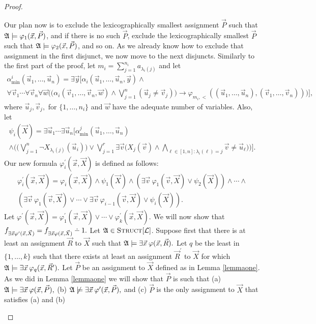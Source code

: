\documentclass[12pt]{article}
\def\dotminus{\mathbin{\ooalign{\hss\raise1ex\hbox{.}\hss\cr
  \mathsurround=0pt$-$}}}
\def\Truc{\textsc{Struct}[\L]}
\def\A{{\frak A}}
\def\L{{\cal L}}
\def\P{\vec{P}}
\def\R{\vec{R}}
\def\X{\vec{X}}
\def\u{\vec{u}} %
\def\v{\vec{v}} %
\def\w{\vec{w}} %
\def\x{\vec{x}} %
\def\y{\vec{y}} %
\begin{document}
\begin{proof}
\begin{enumerate}
Our plan now is to exclude the lexicographically smallest assignment $\P$ such that $\A\models\varphi_1(\x,\P)$, and if there is no such $\P$, exclude the lexicographically smallest $\P$ such that $\A\models\varphi_2(\x,\P)$, and so on. As we already know how to exclude that assignment in the first disjunct, we now move to the next disjuncts. Similarly to the first part of the proof, let $m_i = \sum_{j = 1}^{n_i} a_{\lambda_i(j)}$ and let
\begin{multline*}
\alpha^i_{\min}(\u_1,\dots,\u_n) = \exists\y\Big[ \alpha_i(\u_1,\dots,\u_n,\y)\wedge \\ \forall\v_1\cdots\forall\v_n\forall\w\Big(\big(\alpha_i(\v_1,\dots,\v_n,\w)\wedge\bigvee_{j=1}^n(\u_j\neq\v_j)\big)\to \varphi_{m_i,<}((\u_1,\dots,\u_n),(\v_1,\dots,\v_n))\Big)\Big],
\end{multline*}
where $\u_j,\v_j,$ for $\{1,\ldots,n_i\}$ and $\w$ have the adequate number of variables. Also, let
\begin{multline*}
\psi_i(\X) = \exists\u_1\cdots\exists\u_n\bigg[\alpha^j_{\min}(\u_1,\dots,\u_n) \\ \wedge \bigg(\bigg(\bigvee_{j = 1}^{n}\neg X_{\lambda_i(j)}(\u_i) \bigg) \vee \bigvee_{j=1}^r \exists \v\Big( X_j(\v) \wedge \bigwedge_{\ell\in[1,n]: \lambda_i(\ell) = j} \v \neq \u_\ell\Big) \bigg) \bigg].
\end{multline*}
Our new formula $\varphi_i^\prime(\x,\X)$ is defined as follows:
\begin{multline}
\varphi_i^\prime(\x,\X) = \varphi_i(\x,\X) \wedge \psi_1(\X) \wedge (\exists\v\:\varphi_1(\v,\X)\vee\psi_2(\X)) \wedge \cdots \wedge \\ (\exists\v\:\varphi_1(\v,\X)\vee\cdots\vee\exists\v\:\varphi_{i-1}(\v,\X)\vee\psi_i(\X)).
\end{multline}
Let $\varphi^\prime(\x,\X) = \varphi_1^\prime(\x,\X)\vee\cdots\vee\varphi_k^\prime(\x,\X).$ We will now show that $f_{\exists\x\varphi^\prime(\x,\X)} = f_{\exists\x\varphi(\x,\X)}\dotminus 1.$ Let $\A\in\Truc$. Suppose first that there is at least an assignment $\R$ to $\X$ such that $\A\models\exists\x\:\varphi(\x,\R).$ Let $q$ be the least in $\{1,\ldots,k\}$ such that there exists at least an assignment $\R^\prime$ to $\X$ for which $\A\models\exists\x\:\varphi_q(\x,\R^\prime).$ Let $\P$ be an assignment to $\X$ defined as in Lemma \ref{lemmaone}. As we did in Lemma \ref{lemmaone} we will show that $\P$ is such that (a) $\A\models\exists\x\:\varphi(\x,\P),$ (b) $\A\not\models\exists\x\:\varphi^\prime(\x,\P),$ and (c) $\P$ is the only assignment to $\X$ that satisfies (a) and (b)

\end{enumerate}
\end{proof}
\end{document}
